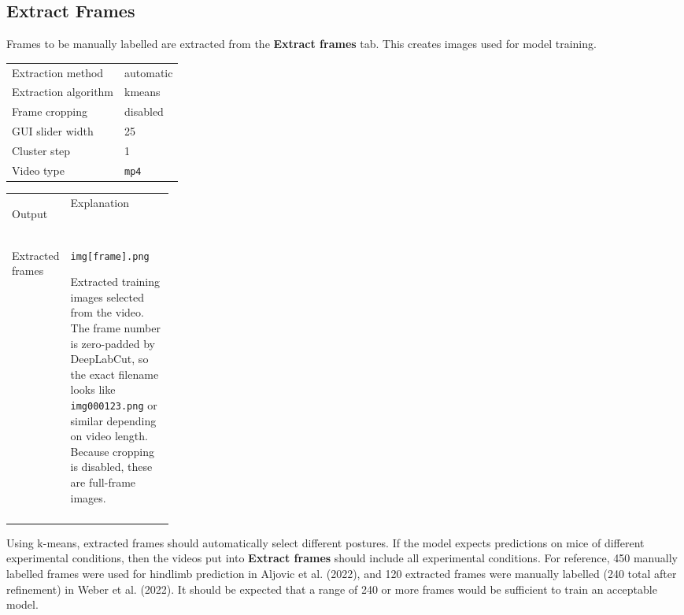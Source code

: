 \documentclass[11pt]{article}
\newif\ifalmaoutputtable
\newcommand{\boxedtoprule}{%
  \ifalmaoutputtable
    \arrayrulecolor{calloutOutputFrame}\hline\rowcolor{calloutOutputHeader}%
  \else
    \arrayrulecolor{almaBlue!62}\hline\rowcolor{almaSky!78}%
  \fi
}
\newcommand{\boxedmidrule}{%
  \ifalmaoutputtable
    \arrayrulecolor{calloutOutputFrame}\hline
  \else
    \arrayrulecolor{calloutDataFrame}\hline
  \fi
}
\newcommand{\boxedbottomrule}{%
  \ifalmaoutputtable
    \arrayrulecolor{calloutOutputFrame}\hline
  \else
    \arrayrulecolor{almaBlue!62}\hline
  \fi
}
\renewcommand{\[}{%
  \par\smallskip\noindent
  \begin{center}%
  \setlength{\fboxsep}{5pt}%
  \setlength{\fboxrule}{0.35pt}%
  \begin{lrbox}{\almaEquationBox}%
  $\displaystyle
}
\renewcommand{\]}{%
  $%
  \end{lrbox}%
  \fcolorbox{equationLine}{equationBack}{\usebox{\almaEquationBox}}%
  \end{center}%
  \smallskip\par
}
\begin{document}
\subsection{Extract Frames}

Frames to be manually labelled are extracted from the \textbf{Extract frames} tab. This creates images used for model training.

\begin{tcolorbox}[software settings,title=\textbf{Extract Frames: Recommended Settings}]
\begin{tabularx}{\linewidth}{KV}
Extraction method & automatic \\
Extraction algorithm & kmeans \\
Frame cropping & disabled \\
GUI slider width & 25 \\
Cluster step & 1 \\
Video type & \texttt{mp4} \\
\end{tabularx}
\end{tcolorbox}

\begin{tcolorbox}[output file box,title=\textbf{Extract Frames Output Files}]
\begin{tabularx}{\linewidth}{
>{\bfseries\raggedright\arraybackslash}p{0.24\linewidth}|
>{\raggedright\arraybackslash}X
}
\boxedtoprule
Output & Explanation \\
\boxedmidrule
Extracted frames & \texttt{img[frame].png}\par
Extracted training images selected from the video. The frame number is zero-padded by DeepLabCut, so the exact filename looks like \texttt{img000123.png} or similar depending on video length. Because cropping is disabled, these are full-frame images. \\
\boxedbottomrule
\end{tabularx}
\end{tcolorbox}

Using k-means, extracted frames should automatically select different postures. If the model expects predictions on mice of different experimental conditions, then the videos put into \textbf{Extract frames} should include all experimental conditions. For reference, 450 manually labelled frames were used for hindlimb prediction in Aljovic et al. (2022), and  120 extracted frames were manually labelled (240 total after refinement) in Weber et al. (2022). It should be expected that a range of 240 or more frames would be sufficient to train an acceptable model. 
\end{document}
